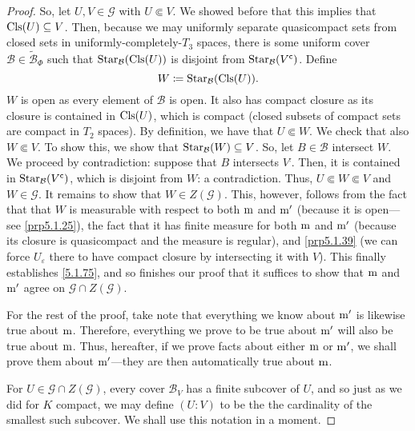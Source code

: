 \begin{thm}
\begin{proof}
So, let $U,V\in \mathcal{G}$ with $U\Subset V$.  We showed before that this implies that $\operatorname{Cls} (U)\subseteq V$.  Then, because we may uniformly separate quasicompact sets from closed sets in uniformly-completely-$T_3$ spaces, there is some uniform cover $\mathcal{B}\in \widetilde{\mathcal{B}}_{\Phi}$ such that $\operatorname{Star} _{\mathcal{B}}(\operatorname{Cls} (U))$ is disjoint from $\operatorname{Star} _{\mathcal{B}}(V^{\mathsf{c}})$.  Define
\begin{equation}
W\coloneqq \operatorname{Star} _{\mathcal{B}}(\operatorname{Cls} (U)).
\end{equation}
$W$ is open as every element of $\mathcal{B}$ is open.  It also has compact closure as its closure is contained in $\operatorname{Cls} (U)$, which is compact (closed subsets of compact sets are compact in $T_2$ spaces).  By definition, we have that $U\Subset W$.  We check that also $W\Subset V$.  To show this, we show that $\operatorname{Star} _{\mathcal{B}}(W)\subseteq V$.  So, let $B\in \mathcal{B}$ intersect $W$.  We proceed by contradiction:  suppose that $B$ intersects $V^{\comp}$.  Then, it is contained in $\operatorname{Star} _{\mathcal{B}}(V^{\mathsf{c}})$, which is disjoint from $W$:  a contradiction.  Thus, $U\Subset W\Subset V$ and $W\in \mathcal{G}$.  It remains to show that $W\in Z(\mathcal{G})$.  This, however, follows from the fact that that $W$ is measurable with respect to both $\mathrm{m}$ and $\mathrm{m} '$ (because it is open---see \cref{prp5.1.25}), the fact that it has finite measure for both $\mathrm{m}$ and $\mathrm{m} '$ (because its closure is quasicompact and the measure is regular), and \cref{prp5.1.39} (we can force $U_{\varepsilon}$ there to have compact closure by intersecting it with $V$).  This finally establishes \eqref{5.1.75}, and so finishes our proof that it suffices to show that $\mathrm{m}$ and $\mathrm{m} '$ agree on $\mathcal{G}\cap Z(\mathcal{G})$.

For the rest of the proof, take note that everything we know about $\mathrm{m} '$ is likewise true about $\mathrm{m}$.  Therefore, everything we prove to be true about $\mathrm{m} '$ will also be true about $\mathrm{m}$.  Thus, hereafter, if we prove facts about either $\mathrm{m}$ or $\mathrm{m} '$, we shall prove them about $\mathrm{m} '$---they are then automatically true about $\mathrm{m}$.

For $U\in \mathcal{G}\cap Z(\mathcal{G})$, every cover $\mathcal{B}_V$ has a finite subcover of $U$, and so just as we did for $K$ compact, we may define $(U:V)$ to be the the cardinality of the smallest such subcover.  We shall use this notation in a moment.


\end{proof}
\end{thm}
